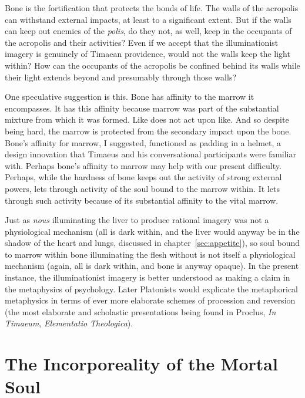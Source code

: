 Bone is the fortification that protects the bonds of life. The walls of the acropolis can withstand external impacts, at least to a significant extent. But if the walls can keep out enemies of the \emph{polis}, do they not, as well, keep in the occupants of the acropolis and their activities? Even if we accept that the illuminationist imagery is genuinely of Timaean providence, would not the walls keep the light within? How can the occupants of the acropolis be confined behind its walls while their light extends beyond and presumably through those walls?

One speculative suggestion is this. Bone has affinity to the marrow it encompasses. It has this affinity because marrow was part of the substantial mixture from which it was formed. Like does not act upon like. And so despite being hard, the marrow is protected from the secondary impact upon the bone. Bone's affinity for marrow, I suggested, functioned as padding in a helmet, a design innovation that Timaeus and his conversational participants were familiar with. Perhaps bone's affinity to marrow may help with our present difficulty. Perhaps, while the hardness of bone keeps out the activity of strong external powers, lets through activity of the soul bound to the marrow within. It lets through such activity because of its substantial affinity to the vital marrow.

Just as \emph{nous} illuminating the liver to produce rational imagery was not a physiological mechanism (all is dark within, and the liver would anyway be in the shadow of the heart and lungs, discussed in chapter~\ref{sec:appetite}), so soul bound to marrow within bone illuminating the flesh without is not itself a physiological mechanism (again, all is dark within, and bone is anyway opaque). In the present instance, the illuminationist imagery is better understood as making a claim in the metaphysics of psychology. Later Platonists would explicate the metaphorical metaphysics in terms of ever more elaborate schemes of procession and reversion (the most elaborate and scholastic presentations being found in Proclus, \emph{In Timaeum}, \emph{Elementatio Theologica}).


\section{The Incorporeality of the Mortal Soul} %
\label{sec:the_incorporeality_of_the_mortal_soul}

